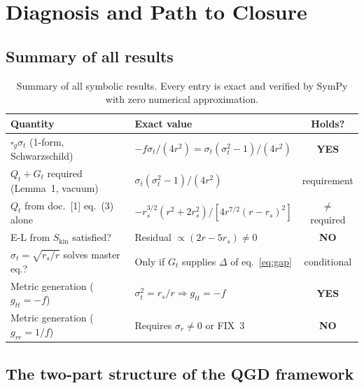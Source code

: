 \documentclass[11pt,a4paper]{article}
\theoremstyle{plain}
\theoremstyle{definition}
\newcommand{\sig}{\sigma}
\newcommand{\sigt}{\sigma_t}
\newcommand{\rs}{r_s}
\newcommand{\boxg}{\square_g}
\newcommand{\Skin}{S_{\mathrm{kin}}}
\begin{document}
\section{Diagnosis and Path to Closure}

\subsection{Summary of all results}

\begin{table}[h]
\centering
\caption{Summary of all symbolic results.  Every entry is exact
and verified by SymPy with zero numerical approximation.}
\label{tab:summary}
\renewcommand{\arraystretch}{1.45}
\begin{tabular}{p{4.3cm} p{6.3cm} c}
\toprule
Quantity & Exact value & Holds? \\
\midrule
$\boxg\sigt$ (1-form, Schwarzschild) &
$-f\sigt/(4r^2) = \sigt(\sigt^2-1)/(4r^2)$ & \textbf{YES} \\

$Q_t + G_t$ required (Lemma~1, vacuum) &
$\sigt(\sigt^2-1)/(4r^2)$ & requirement \\

$Q_t$ from doc.~[1] eq.~(3) alone &
$-r_s^{3/2}(r^2+2\rs^2)/[4r^{7/2}(r-\rs)^2]$ &
$\ne$ required \\

E-L from $\Skin$ satisfied? &
Residual $\propto (2r-5\rs) \ne 0$ & \textbf{NO} \\

$\sigt = \sqrt{\rs/r}$ solves master eq.? &
Only if $G_t$ supplies $\Delta$ of eq.~\eqref{eq:gap} & conditional \\

Metric generation ($g_{tt}=-f$) & $\sigt^2 = \rs/r \Rightarrow g_{tt}=-f$ & \textbf{YES} \\

Metric generation ($g_{rr}=1/f$) & Requires $\sig_r \ne 0$ or FIX~3 & \textbf{NO} \\
\bottomrule
\end{tabular}
\end{table}

\subsection{The two-part structure of the QGD framework}
\end{document}

